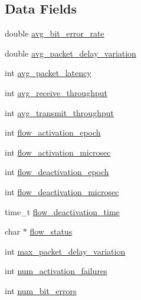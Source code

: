 \subsection*{Data Fields}
\begin{DoxyCompactItemize}
\item 
double \hyperlink{structmobile__gtp__per__flow__metrics_a450a2acbcc4dd919bb36777e1f0395a0}{avg\+\_\+bit\+\_\+error\+\_\+rate}
\item 
double \hyperlink{structmobile__gtp__per__flow__metrics_ad619a28eb142fb173499d94a3e292232}{avg\+\_\+packet\+\_\+delay\+\_\+variation}
\item 
int \hyperlink{structmobile__gtp__per__flow__metrics_aa1c0ff4dc2e882e6ab940fa2d8fc5f6a}{avg\+\_\+packet\+\_\+latency}
\item 
int \hyperlink{structmobile__gtp__per__flow__metrics_a4ac7fad1fea3845695d6491cb13d0187}{avg\+\_\+receive\+\_\+throughput}
\item 
int \hyperlink{structmobile__gtp__per__flow__metrics_a1405e6a71611fa80ad366cb44f7fd0e1}{avg\+\_\+transmit\+\_\+throughput}
\item 
int \hyperlink{structmobile__gtp__per__flow__metrics_a4d994baf3d4aead12c78820631c7b23e}{flow\+\_\+activation\+\_\+epoch}
\item 
int \hyperlink{structmobile__gtp__per__flow__metrics_a37f4239f32c37591cfb931930370bcb1}{flow\+\_\+activation\+\_\+microsec}
\item 
int \hyperlink{structmobile__gtp__per__flow__metrics_a88653ac380668d8bb85da4a06e125e3d}{flow\+\_\+deactivation\+\_\+epoch}
\item 
int \hyperlink{structmobile__gtp__per__flow__metrics_aa44c196dc2d557e6669f85eedda3f43d}{flow\+\_\+deactivation\+\_\+microsec}
\item 
time\+\_\+t \hyperlink{structmobile__gtp__per__flow__metrics_a64780311b54ec5442403f9e0287eb395}{flow\+\_\+deactivation\+\_\+time}
\item 
char $\ast$ \hyperlink{structmobile__gtp__per__flow__metrics_a4be001fad7fe7eae7b502b52198153b0}{flow\+\_\+status}
\item 
int \hyperlink{structmobile__gtp__per__flow__metrics_a55f37ade16fb28661f2f333f3f1e8883}{max\+\_\+packet\+\_\+delay\+\_\+variation}
\item 
int \hyperlink{structmobile__gtp__per__flow__metrics_aa0ebbd133a7932699a0e4405fd6e351c}{num\+\_\+activation\+\_\+failures}
\item 
int \hyperlink{structmobile__gtp__per__flow__metrics_a734b5a22e1c1d6f1956782fb415c4e2c}{num\+\_\+bit\+\_\+errors}

\end{DoxyCompactItemize}
